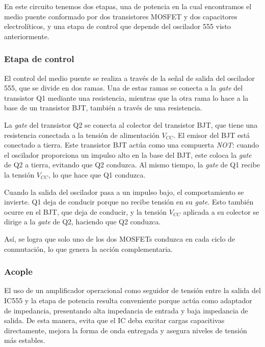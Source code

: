 En este circuito tenemos dos etapas, una de potencia en la cual encontramos el medio puente conformado por dos transistores MOSFET y dos capacitores electrolíticos, y una etapa de control que depende del oscilador 555 visto anteriormente.

\subsubsection{Etapa de control}

El control del medio puente se realiza a través de la señal de salida del oscilador 555, que se divide en dos ramas. Una de estas ramas se conecta a la \textit{gate} del transistor Q1 mediante una resistencia, mientras que la otra rama lo hace a la base de un transistor BJT, también a través de una resistencia.

La \textit{gate} del transistor Q2 se conecta al colector del transistor BJT, que tiene una resistencia conectada a la tensión de alimentación $V_{CC}$. El emisor del BJT está conectado a tierra. Este transistor BJT actúa como una compuerta \textit{NOT}: cuando el oscilador proporciona un impulso alto en la base del BJT, este coloca la \textit{gate} de Q2 a tierra, evitando que Q2 conduzca. Al mismo tiempo, la \textit{gate} de Q1 recibe la tensión $V_{CC}$, lo que hace que Q1 conduzca.

Cuando la salida del oscilador pasa a un impulso bajo, el comportamiento se invierte. Q1 deja de conducir porque no recibe tensión en su \textit{gate}. Esto también ocurre en el BJT, que deja de conducir, y la tensión $V_{CC}$ aplicada a su colector se dirige a la \textit{gate} de Q2, haciendo que Q2 conduzca.

Así, se logra que solo uno de los dos MOSFETs conduzca en cada ciclo de conmutación, lo que genera la acción complementaria.

\subsubsection{Acople}

El uso de un amplificador operacional como seguidor de tensión entre la salida del IC555 y la etapa de potencia resulta conveniente porque actúa como adaptador de impedancia, presentando alta impedancia de entrada y baja impedancia de salida. De esta manera, evita que el IC deba excitar cargas capacitivas directamente, mejora la forma de onda entregada y asegura niveles de tensión más estables.


